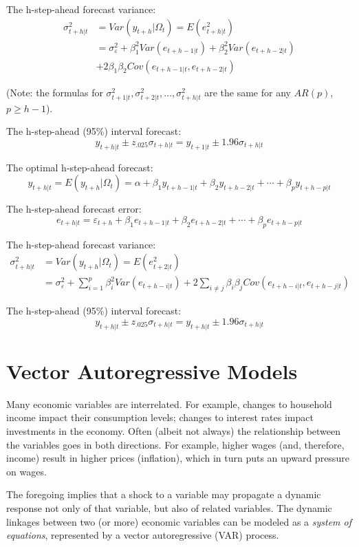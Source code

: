\documentclass[
  12pt,
  oneside]{book}
\begin{document}
The h-step-ahead forecast variance:
\[\begin{aligned}
\sigma_{t+h|t}^2 &= Var(y_{t+h}|\Omega_t) = E(e_{t+h|t}^2) \\
&= \sigma_{\varepsilon}^2+\beta_1^2 Var(e_{t+h-1|t})+\beta_2^2 Var(e_{t+h-2|t}) \\
&+2\beta_1\beta_2Cov(e_{t+h-1|t},e_{t+h-2|t})
\end{aligned}\]

(Note: the formulas for \(\sigma_{t+1|t}^2,\sigma_{t+2|t}^2,\ldots,\sigma_{t+h|t}^2\) are the same for any \(AR(p)\), \(p \geq h-1\)).

The h-step-ahead (95\%) interval forecast: \[y_{t+h|t} \pm z_{.025}\sigma_{t+h|t} = y_{t+1|t} \pm 1.96\sigma_{t+h|t}\]

The optimal h-step-ahead forecast: \[y_{t+h|t} = E(y_{t+h}|\Omega_t) = \alpha + \beta_1 y_{t+h-1|t} + \beta_2 y_{t+h-2|t} + \cdots + \beta_p y_{t+h-p|t}\]

The h-step-ahead forecast error: \[e_{t+h|t} = \varepsilon_{t+h} + \beta_1 e_{t+h-1|t} + \beta_2 e_{t+h-2|t} + \cdots + \beta_p e_{t+h-p|t}\]

The h-step-ahead forecast variance:
\[\begin{aligned}
\sigma_{t+h|t}^2 & = Var(y_{t+h}|\Omega_t) = E(e_{t+2|t}^2) \\
&= \sigma_{\varepsilon}^2 + \sum_{i=1}^{p}\beta_i^2 Var(e_{t+h-i|t}) + 2\sum_{i \neq j}\beta_i\beta_j Cov(e_{t+h-i|t},e_{t+h-j|t})
\end{aligned}\]

The h-step-ahead (95\%) interval forecast: \[y_{t+h|t} \pm z_{.025}\sigma_{t+h|t} = y_{t+h|t} \pm 1.96\sigma_{t+h|t}\]

\hypertarget{vector-autoregressive-models}{%
\chapter{Vector Autoregressive Models}\label{vector-autoregressive-models}}

Many economic variables are interrelated. For example, changes to household income impact their consumption levels; changes to interest rates impact investments in the economy. Often (albeit not always) the relationship between the variables goes in both directions. For example, higher wages (and, therefore, income) result in higher prices (inflation), which in turn puts an upward pressure on wages.

The foregoing implies that a shock to a variable may propagate a dynamic response not only of that variable, but also of related variables. The dynamic linkages between two (or more) economic variables can be modeled as a \emph{system of equations}, represented by a vector autoregressive (VAR) process.
\end{document}
